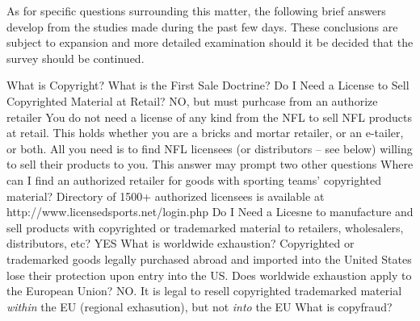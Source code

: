\documentclass[letterpaper,11pt]{texMemo}
\begin{document}
As for specific questions surrounding this matter, the following brief answers develop from the studies made during the past few days.  These conclusions are subject to expansion and more detailed examination should it be decided that the survey should be continued.

What is Copyright?
What is the First Sale Doctrine?
Do I Need a License to Sell Copyrighted Material at Retail?
	NO, but must purhcase from an authorize retailer
		You do not need a license of any kind from the NFL to sell NFL products at retail. This holds whether you are a bricks and mortar retailer, or an e-tailer, or both. All you need is to find NFL licensees (or distributors – see below) willing to sell their products to you. This answer may prompt two other questions
Where can I find an authorized retailer for goods with sporting teams' copyrighted material?
	Directory of 1500+ authorized licensees is available at http://www.licensedsports.net/login.php
Do I Need a Licesne to manufacture and sell products with copyrighted or trademarked material to retailers, wholesalers, distributors, etc?
	YES
What is worldwide exhaustion?
	Copyrighted or trademarked goods legally purchased abroad and imported into the United States lose their protection upon entry into the US.
Does worldwide exhaustion apply to the European Union?
	NO. It is legal to resell copyrighted trademarked material \emph{within} the EU (regional exhasution), but not \emph{into} the EU
What is copyfraud?
\end{document}
